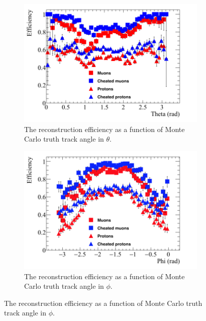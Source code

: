 \begin{figure}[h!]
\begin{subfigure}{0.48\textwidth}
        \centering
        \includegraphics[width=\textwidth]{Effic_SingSamps_Theta}
        \caption{The reconstruction efficiency as a function of Monte Carlo truth track angle in $\theta$.}
        \label{fig:Isol_Effic_Theta}
  \end{subfigure}%
  \hspace{0.03\textwidth}%
  \begin{subfigure}{0.48\textwidth}
        \centering
        \includegraphics[width=\textwidth]{Effic_SingSamps_Phi}
        \caption{The reconstruction efficiency as a function of Monte Carlo truth track angle in $\phi$.}
        \label{fig:Isol_Effic_Phi}
  \end{subfigure}

\end{figure}
